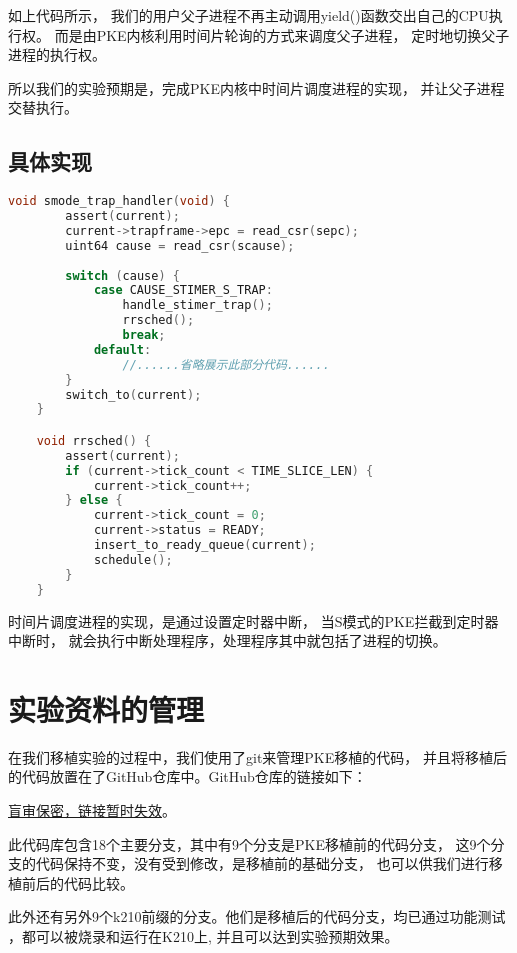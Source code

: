 如上代码所示，
我们的用户父子进程不再主动调用yield()函数交出自己的CPU执行权。
而是由PKE内核利用时间片轮询的方式来调度父子进程，
定时地切换父子进程的执行权。

所以我们的实验预期是，完成PKE内核中时间片调度进程的实现，
并让父子进程交替执行。

\subsection{具体实现}

\begin{lstlisting}[caption={时间片调度}, label={lst:time_slice}, language=C]
    void smode_trap_handler(void) {
        assert(current);
        current->trapframe->epc = read_csr(sepc);
        uint64 cause = read_csr(scause);
    
        switch (cause) {
            case CAUSE_STIMER_S_TRAP:
                handle_stimer_trap();
                rrsched();
                break;
            default:
                //......省略展示此部分代码......
        }
        switch_to(current);
    }

    void rrsched() {
        assert(current);
        if (current->tick_count < TIME_SLICE_LEN) {
            current->tick_count++;
        } else {
            current->tick_count = 0;
            current->status = READY;
            insert_to_ready_queue(current);
            schedule();
        }
    }    
\end{lstlisting}

时间片调度进程的实现，是通过设置定时器中断，
当S模式的PKE拦截到定时器中断时，
就会执行中断处理程序，处理程序其中就包括了进程的切换。

\section{实验资料的管理}

在我们移植实验的过程中，我们使用了git来管理PKE移植的代码，
并且将移植后的代码放置在了GitHub仓库中。GitHub仓库的链接如下：

\href{https://baidu.com}{盲审保密，链接暂时失效}。

此代码库包含18个主要分支，其中有9个分支是PKE移植前的代码分支，
这9个分支的代码保持不变，没有受到修改，是移植前的基础分支，
也可以供我们进行移植前后的代码比较。

此外还有另外9个k210前缀的分支。他们是移植后的代码分支，均已通过功能测试
，都可以被烧录和运行在K210上, 并且可以达到实验预期效果。


